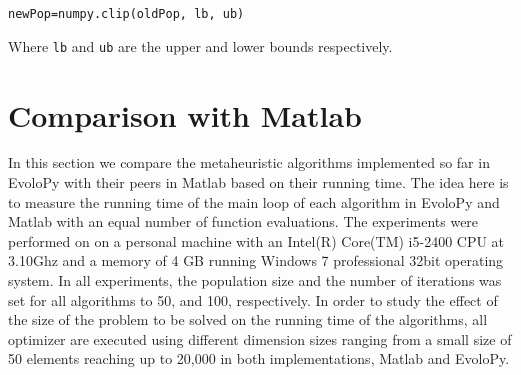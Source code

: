 \documentclass[a4paper,twoside]{article}
\begin{document}
\texttt{newPop=numpy.clip(oldPop, lb, ub)}

Where \texttt{lb} and \texttt{ub} are the upper and lower bounds respectively.

\section{Comparison with Matlab}

In this section we compare the metaheuristic algorithms implemented so far in EvoloPy with their peers in Matlab based on their running time. The idea here is to measure the running time of the main loop of each algorithm in EvoloPy and Matlab with an equal number of function evaluations. The experiments were performed on on a personal machine with an  Intel(R) Core(TM) i5-2400 CPU at 3.10Ghz and a memory of 4 GB running Windows 7 professional 32bit operating system. In all experiments, the population size and the number of iterations was set for all algorithms to 50, and 100, respectively. In order to study the effect of the size of the problem to be solved on the running time of the algorithms, all optimizer are executed using different dimension sizes ranging from a small size of 50 elements reaching up to 20,000 in both implementations, Matlab and EvoloPy. 
\end{document}
